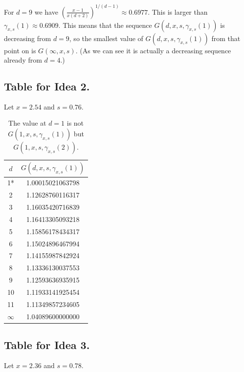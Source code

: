 \documentclass[12pt,a4paper]{amsart}
\numberwithin{equation}{section}
\theoremstyle{plain}
\theoremstyle{definition}
\newcommand{\1}{\textbf{1}}
\begin{document}
\noindent For $d=9$ we have
$\left(\frac{x-1}{x(d+2)}\right)^{1/(d-1)}\approx 0.6977$. This is larger than $\gamma_{x,s}(1)\approx 0.6909$. This means that the sequence $G(d,x,s,\gamma_{x,s}(1))$ is decreasing from $d=9$, so the smallest value of $G(d,x,s,\gamma_{x,s}(1))$ from that point on is $G(\infty,x,s)$. (As we can see it is actually a decreasing sequence already from $d=4$.)
\bigskip

\subsection{Table for Idea 2.}

Let $x=2.54$ and $s=0.76$. 

\begin{table}[!h]
\begin{center}
\begin{tabular}{|c|c|} \hline
$d$ & $G(d,x,s,\gamma_{x,s}(1))$ \\ \hline
1* & 1.00015021063798 \\ \hline
2 & 1.12628760116317 \\ \hline
3 & 1.16035420716839 \\ \hline
4 & 1.16413305093218 \\ \hline
5 & 1.15856178434317 \\ \hline
6 & 1.15024896467994 \\ \hline
7 & 1.14155987842924 \\ \hline
8 & 1.13336130037553 \\ \hline
9 & 1.12593636935915 \\ \hline
10 & 1.11933141925454 \\ \hline
11 & 1.11349857234605 \\ \hline
$\infty$ & 1.04089600000000 \\ \hline
\end{tabular}
\caption{The value at $d=1$ is not $G(1,x,s,\gamma_{x,s}(1))$ but $G(1,x,s,\gamma_{x,s}(2))$.}
\end{center}
\end{table}
\bigskip


\bigskip

\subsection{Table for Idea 3.}

Let $x=2.36$ and $s=0.78$. 
\end{document}

